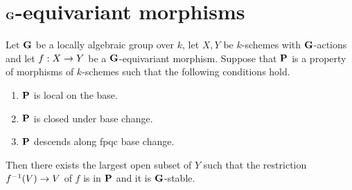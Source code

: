 \section{$\mathbf{G}$-equivariant morphisms}

\begin{theorem}\label{theorem:base_locus_of_certain_classes_of_morphisms_are_stable_under_locally_algebraic_group_action}
Let $\mathbf{G}$ be a locally algebraic group over $k$, let $X,Y$ be $k$-schemes with $\mathbf{G}$-actions and let $f:X\rightarrow Y$ be a $\mathbf{G}$-equivariant morphism. Suppose that $\mathbf{P}$ is a property of morphisms of $k$-schemes such that the following conditions hold.
\begin{enumerate}[label=\emph{\textbf{(\arabic*)}}, leftmargin=3.0em]
\item $\mathbf{P}$ is local on the base.
\item $\mathbf{P}$ is closed under base change.
\item $\mathbf{P}$ descends along fpqc base change.
\end{enumerate}
Then there exists the largest open subset of $Y$ such that the restriction $f^{-1}(V)\rightarrow V$ of $f$ is in $\mathbf{P}$ and it is $\mathbf{G}$-stable.
\end{theorem}
